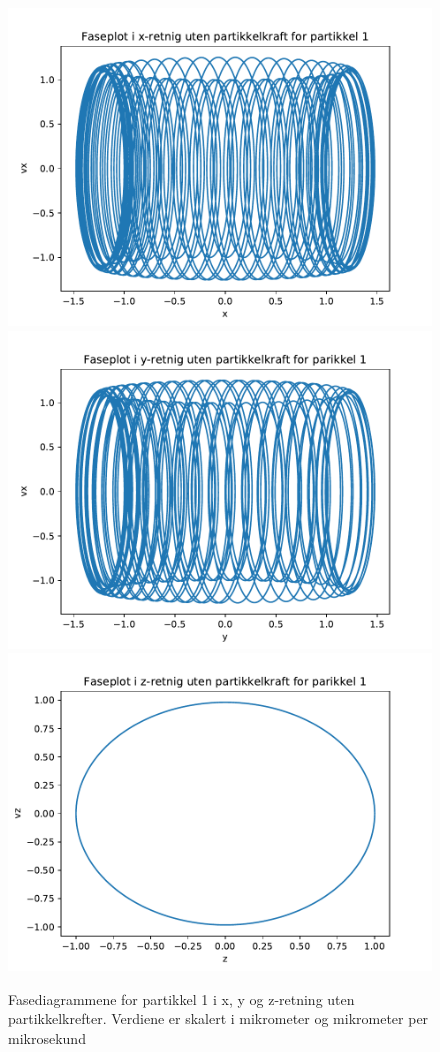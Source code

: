 \documentclass[reprint,english,notitlepage]{revtex4-1}  %
\begin{document}
\begin{figure}[H]
	\label{fasenoint1}
	\centering 
	\includegraphics[scale=0.4]{../pythonplots/xnoint1.pdf}
	\includegraphics[scale=0.4]{../pythonplots/ynoint1.pdf}
	\includegraphics[scale=0.4]{../pythonplots/znoint1.pdf}
	\caption{Fasediagrammene for partikkel 1 i x, y og z-retning uten partikkelkrefter. Verdiene er skalert i mikrometer og mikrometer per mikrosekund}
\end{figure}
\end{document}
